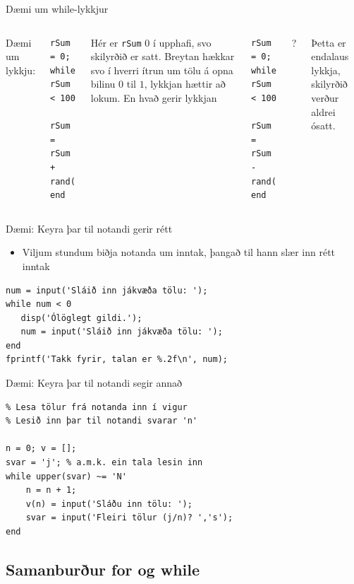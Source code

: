 \documentclass{beamer}
\begin{document}
\begin{frame}[fragile]{Dæmi um while-lykkjur}
\begin{columns}
\vspace{0.8cm}

Dæmi um lykkju:
\begin{verbatim}
rSum = 0;
while rSum < 100
   rSum = rSum + rand();
end
\end{verbatim}
Hér er \texttt{rSum} $0$ í upphafi, svo skilyrðið er satt. Breytan hækkar svo í hverri ítrun um tölu á opna bilinu $0$ til $1$, lykkjan hættir að lokum.\pause
{}
En hvað gerir lykkjan
\begin{verbatim}
rSum = 0;
while rSum < 100
   rSum = rSum - rand();
end
\end{verbatim}
?
\pause

Þetta er endalaus lykkja, skilyrðið verður aldrei ósatt.
\end{columns}
\end{frame}

\begin{frame}[fragile]{Dæmi: Keyra þar til notandi gerir rétt}
\begin{itemize}
 \item Viljum stundum biðja notanda um inntak, þangað til hann slær inn rétt inntak
\end{itemize}
\begin{verbatim}
num = input('Sláið inn jákvæða tölu: ');
while num < 0
   disp('Ólöglegt gildi.');
   num = input('Sláið inn jákvæða tölu: ');
end
fprintf('Takk fyrir, talan er %.2f\n', num);
\end{verbatim}

\end{frame}


\begin{frame}[fragile]{Dæmi: Keyra þar til notandi segir annað}
\begin{verbatim}
% Lesa tölur frá notanda inn í vigur
% Lesið inn þar til notandi svarar 'n'

n = 0; v = [];
svar = 'j'; % a.m.k. ein tala lesin inn
while upper(svar) ~= 'N'
    n = n + 1;
    v(n) = input('Sláðu inn tölu: ');
    svar = input('Fleiri tölur (j/n)? ','s');
end
\end{verbatim}
\end{frame}

\subsection{Samanburður for og while}
\end{document}

